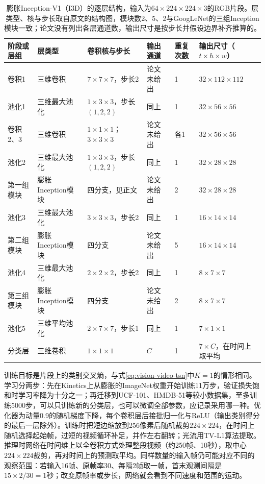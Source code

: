 \begin{table}[tbp]
  \centering
  \small
  \begin{tabularx}{\linewidth}{@{}llXlll@{}}
    \toprule
    阶段或层组 & 层类型 & 卷积核与步长 & 输出通道 & 重复次数 & 输出尺寸（$t\times h\times w$）\\
    \midrule
    卷积1 & 三维卷积 & $7\times7\times7$，步长2 & 论文未给出 & 1 & $32\times112\times112$\\
    池化1 & 三维最大池化 & $1\times3\times3$，步长$(1,2,2)$ & 同上 & 1 & $32\times56\times56$\\
    卷积2、3 & 三维卷积 & $1\times1\times1$；$3\times3\times3$ & 论文未给出 & 各1 & $32\times56\times56$\\
    池化2 & 三维最大池化 & $1\times3\times3$，步长$(1,2,2)$ & 同上 & 1 & $32\times28\times28$\\
    第一组模块 & 膨胀Inception模块 & 四分支，见正文 & 论文未给出 & 2 & $32\times28\times28$\\
    池化3 & 三维最大池化 & $3\times3\times3$，步长2 & 同上 & 1 & $16\times14\times14$\\
    第二组模块 & 膨胀Inception模块 & 四分支 & 论文未给出 & 5 & $16\times14\times14$\\
    池化4 & 三维最大池化 & $2\times2\times2$，步长2 & 同上 & 1 & $8\times7\times7$\\
    第三组模块 & 膨胀Inception模块 & 四分支 & 论文未给出 & 2 & $8\times7\times7$\\
    池化5 & 三维平均池化 & $2\times7\times7$，步长1 & 同上 & 1 & $7\times1\times1$\\
    分类层 & 三维卷积 & $1\times1\times1$ & $C$ & 1 & $7\times C$，在时间上取平均\\
    \bottomrule
  \end{tabularx}
  \caption{膨胀Inception-V1（I3D）的逐层结构，输入为$64\times224\times224\times3$的RGB片段。层类型、核与步长取自原文的结构图，模块数2、5、2与GoogLeNet的三组Inception模块一致；论文没有列出各层通道数，输出尺寸是按步长并假设边界补齐推算的。}
  \label{tab:vision-video-i3d-arch}
\end{table}

训练目标是片段上的类别交叉熵，与式\eqref{eq:vision-video-tsn}中$K=1$的情形相同。学习分两步：先在Kinetics上从膨胀的ImageNet权重开始训练11万步，验证损失饱和时学习率降为十分之一；再迁移到UCF-101、HMDB-51等较小数据集，至多训练5000步，可以只训练新的分类层，也可以微调全部参数，应记录采用哪一种。优化器为动量0.9的随机梯度下降，每个卷积层后接批归一化与ReLU（输出类别得分的最后一层除外）。训练时把短边缩放到256像素后随机裁剪$224\times224$，在时间上随机选择起始帧，过短的视频循环补足，并作左右翻转；光流用TV-L1算法提取。推理时网络在时间维上以全卷积方式处理整段视频（约250帧、10秒），取中心$224\times224$裁剪，再对时间上的预测取平均。同样数量的输入帧仍可能对应不同的观察范围：若输入16帧、原帧率30、每隔2帧取一帧，首末观测间隔是$15\times2/30=1$秒；改变原帧率或步长，网络就会看到不同速度和范围的运动。

